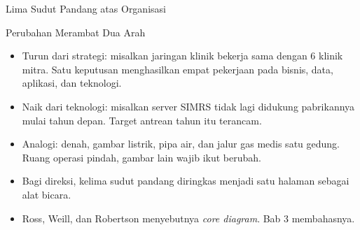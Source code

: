 \documentclass[aspectratio=169, table, 12pt]{beamer}
\begin{document}
\begin{frame}{{\Large Lima Sudut Pandang atas Organisasi}}
  \centering
\end{frame}

\begin{frame}{{\Large Perubahan Merambat Dua Arah}}
  \vspace{6pt}
  \small
  \begin{itemize}
    \item Turun dari strategi: misalkan jaringan klinik bekerja sama dengan 6 klinik mitra. Satu
          keputusan menghasilkan empat pekerjaan pada bisnis, data, aplikasi, dan teknologi.
    \item Naik dari teknologi: misalkan server SIMRS tidak lagi didukung pabrikannya mulai tahun depan.
          Target antrean tahun itu terancam.
    \item Analogi: denah, gambar listrik, pipa air, dan jalur gas medis satu gedung. Ruang operasi
          pindah, gambar lain wajib ikut berubah.
    \item Bagi direksi, kelima sudut pandang diringkas menjadi satu halaman sebagai alat bicara.
    \item Ross, Weill, dan Robertson menyebutnya \textit{core diagram}. Bab 3 membahasnya.
  \end{itemize}
\end{frame}
\end{document}

